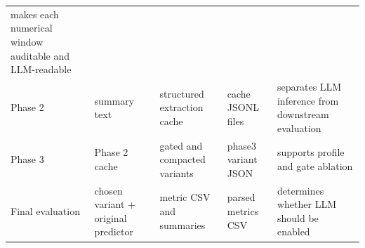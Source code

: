 \documentclass[
  11pt,
  a4paper]{article}
\begin{document}
\begin{longtable}[]{@{}lllll@{}}
\begin{minipage}[t]{0.17\columnwidth}
makes each numerical window auditable and LLM-readable\strut
\end{minipage}\tabularnewline
\begin{minipage}[t]{0.17\columnwidth}\raggedright
Phase 2\strut
\end{minipage} & \begin{minipage}[t]{0.17\columnwidth}\raggedright
summary text\strut
\end{minipage} & \begin{minipage}[t]{0.17\columnwidth}\raggedright
structured extraction cache\strut
\end{minipage} & \begin{minipage}[t]{0.17\columnwidth}\raggedright
cache JSONL files\strut
\end{minipage} & \begin{minipage}[t]{0.17\columnwidth}\raggedright
separates LLM inference from downstream evaluation\strut
\end{minipage}\tabularnewline
\begin{minipage}[t]{0.17\columnwidth}\raggedright
Phase 3\strut
\end{minipage} & \begin{minipage}[t]{0.17\columnwidth}\raggedright
Phase 2 cache\strut
\end{minipage} & \begin{minipage}[t]{0.17\columnwidth}\raggedright
gated and compacted variants\strut
\end{minipage} & \begin{minipage}[t]{0.17\columnwidth}\raggedright
phase3 variant JSON\strut
\end{minipage} & \begin{minipage}[t]{0.17\columnwidth}\raggedright
supports profile and gate ablation\strut
\end{minipage}\tabularnewline
\begin{minipage}[t]{0.17\columnwidth}\raggedright
Final evaluation\strut
\end{minipage} & \begin{minipage}[t]{0.17\columnwidth}\raggedright
chosen variant + original predictor\strut
\end{minipage} & \begin{minipage}[t]{0.17\columnwidth}\raggedright
metric CSV and summaries\strut
\end{minipage} & \begin{minipage}[t]{0.17\columnwidth}\raggedright
parsed metrics CSV\strut
\end{minipage} & \begin{minipage}[t]{0.17\columnwidth}\raggedright
determines whether LLM should be enabled\strut
\end{minipage}\tabularnewline
\bottomrule
\end{longtable}
\end{document}

